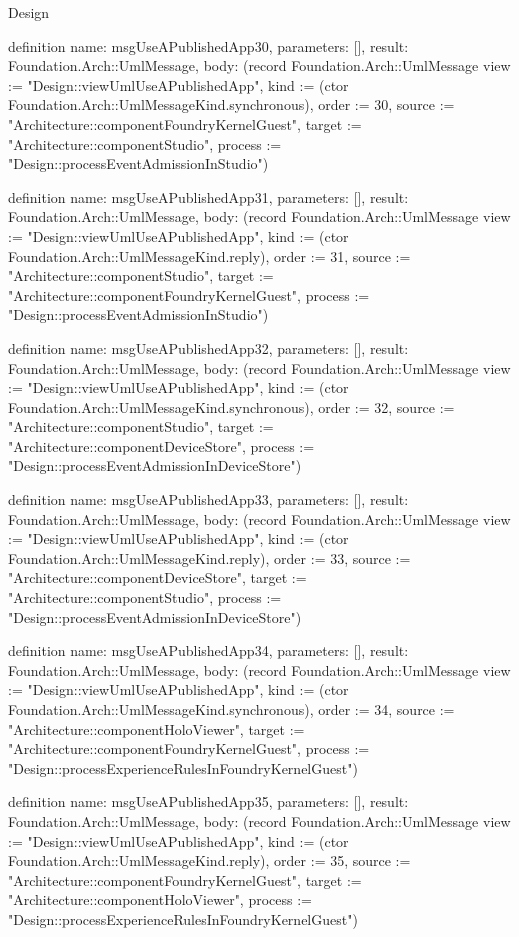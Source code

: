 \begin{lexlean}{Design}
\begin{semanticmodule}
definition{
  name: msgUseAPublishedApp30,
  parameters: [],
  result: Foundation.Arch::UmlMessage,
  body: (record Foundation.Arch::UmlMessage {view := "Design::viewUmlUseAPublishedApp", kind := (ctor Foundation.Arch::UmlMessageKind.synchronous), order := 30, source := "Architecture::componentFoundryKernelGuest", target := "Architecture::componentStudio", process := "Design::processEventAdmissionInStudio"})
}

definition{
  name: msgUseAPublishedApp31,
  parameters: [],
  result: Foundation.Arch::UmlMessage,
  body: (record Foundation.Arch::UmlMessage {view := "Design::viewUmlUseAPublishedApp", kind := (ctor Foundation.Arch::UmlMessageKind.reply), order := 31, source := "Architecture::componentStudio", target := "Architecture::componentFoundryKernelGuest", process := "Design::processEventAdmissionInStudio"})
}

definition{
  name: msgUseAPublishedApp32,
  parameters: [],
  result: Foundation.Arch::UmlMessage,
  body: (record Foundation.Arch::UmlMessage {view := "Design::viewUmlUseAPublishedApp", kind := (ctor Foundation.Arch::UmlMessageKind.synchronous), order := 32, source := "Architecture::componentStudio", target := "Architecture::componentDeviceStore", process := "Design::processEventAdmissionInDeviceStore"})
}

definition{
  name: msgUseAPublishedApp33,
  parameters: [],
  result: Foundation.Arch::UmlMessage,
  body: (record Foundation.Arch::UmlMessage {view := "Design::viewUmlUseAPublishedApp", kind := (ctor Foundation.Arch::UmlMessageKind.reply), order := 33, source := "Architecture::componentDeviceStore", target := "Architecture::componentStudio", process := "Design::processEventAdmissionInDeviceStore"})
}

definition{
  name: msgUseAPublishedApp34,
  parameters: [],
  result: Foundation.Arch::UmlMessage,
  body: (record Foundation.Arch::UmlMessage {view := "Design::viewUmlUseAPublishedApp", kind := (ctor Foundation.Arch::UmlMessageKind.synchronous), order := 34, source := "Architecture::componentHoloViewer", target := "Architecture::componentFoundryKernelGuest", process := "Design::processExperienceRulesInFoundryKernelGuest"})
}

definition{
  name: msgUseAPublishedApp35,
  parameters: [],
  result: Foundation.Arch::UmlMessage,
  body: (record Foundation.Arch::UmlMessage {view := "Design::viewUmlUseAPublishedApp", kind := (ctor Foundation.Arch::UmlMessageKind.reply), order := 35, source := "Architecture::componentFoundryKernelGuest", target := "Architecture::componentHoloViewer", process := "Design::processExperienceRulesInFoundryKernelGuest"})
}


\end{semanticmodule}
\end{lexlean}
